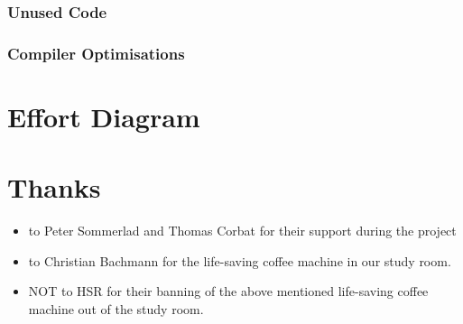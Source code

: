\documentclass[12pt,halfparskip,DIV11,BCOR10mm]{scrreprt}
\begin{document}
\subsubsection{Unused Code}
\subsubsection{Compiler Optimisations}

\clearpage

\section{Effort Diagram}

\clearpage

\section{Thanks}

\begin{itemize}
	\item to Peter Sommerlad and Thomas Corbat for their support during the project
	\item to Christian Bachmann for the life-saving coffee machine in our study room. 
	\item NOT to HSR for their banning of the above mentioned life-saving coffee machine out of the study room.
\end{itemize}



\listoffigures



\end{document}
